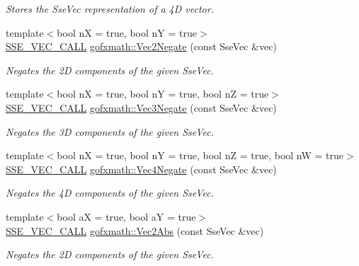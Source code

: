 \begin{DoxyCompactItemize}
\begin{DoxyCompactList}\small\item\em Stores the Sse\+Vec representation of a 4\+D vector. \end{DoxyCompactList}\item 
{\footnotesize template$<$bool n\+X = true, bool n\+Y = true$>$ }\\\hyperlink{ssevec__math__defs_8h_a97454f977a5281455cecacce1e8ba670}{S\+S\+E\+\_\+\+V\+E\+C\+\_\+\+C\+A\+L\+L} \hyperlink{group___s_i_m_d_vec_math_gaba273219fc8b8a373abad0e833505511}{gofxmath\+::\+Vec2\+Negate} (const Sse\+Vec \&vec)
\begin{DoxyCompactList}\small\item\em Negates the 2\+D components of the given Sse\+Vec. \end{DoxyCompactList}\item 
{\footnotesize template$<$bool n\+X = true, bool n\+Y = true, bool n\+Z = true$>$ }\\\hyperlink{ssevec__math__defs_8h_a97454f977a5281455cecacce1e8ba670}{S\+S\+E\+\_\+\+V\+E\+C\+\_\+\+C\+A\+L\+L} \hyperlink{group___s_i_m_d_vec_math_gad5ea03b6d75bf8e3d39a0434b4616b9c}{gofxmath\+::\+Vec3\+Negate} (const Sse\+Vec \&vec)
\begin{DoxyCompactList}\small\item\em Negates the 3\+D components of the given Sse\+Vec. \end{DoxyCompactList}\item 
{\footnotesize template$<$bool n\+X = true, bool n\+Y = true, bool n\+Z = true, bool n\+W = true$>$ }\\\hyperlink{ssevec__math__defs_8h_a97454f977a5281455cecacce1e8ba670}{S\+S\+E\+\_\+\+V\+E\+C\+\_\+\+C\+A\+L\+L} \hyperlink{group___s_i_m_d_vec_math_ga4f827fad311b93fa33bd61894aeec1cc}{gofxmath\+::\+Vec4\+Negate} (const Sse\+Vec \&vec)
\begin{DoxyCompactList}\small\item\em Negates the 4\+D components of the given Sse\+Vec. \end{DoxyCompactList}\item 
{\footnotesize template$<$bool a\+X = true, bool a\+Y = true$>$ }\\\hyperlink{ssevec__math__defs_8h_a97454f977a5281455cecacce1e8ba670}{S\+S\+E\+\_\+\+V\+E\+C\+\_\+\+C\+A\+L\+L} \hyperlink{group___s_i_m_d_vec_math_gae52a21e900378c201bcd250b3955d44f}{gofxmath\+::\+Vec2\+Abs} (const Sse\+Vec \&vec)
\begin{DoxyCompactList}\small\item\em Negates the 2\+D components of the given Sse\+Vec. \end{DoxyCompactList}\item 

\end{DoxyCompactItemize}
